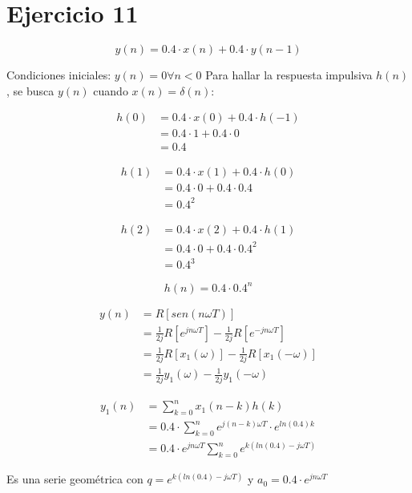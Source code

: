 \documentclass[../../guia1.tex]{subfiles}
\begin{document}
\section*{Ejercicio 11}
\[y(n) = 0.4\cdot x(n) + 0.4\cdot y(n-1)\]

Condiciones iniciales: $y(n)=0 \forall n<0$
Para hallar la respuesta impulsiva $h(n)$, se busca $y(n)$ cuando $x(n) = \delta(n)$:

\begin{align*}
	h(0) &= 0.4\cdot x(0) + 0.4 \cdot h(-1)\\
		 &= 0.4\cdot 1 + 0.4 \cdot 0\\
		 &= 0.4
\end{align*}


\begin{align*}
	h(1) &= 0.4\cdot x(1) + 0.4 \cdot h(0)\\
		 &= 0.4\cdot 0 + 0.4 \cdot 0.4\\
		 &=0.4^2
\end{align*}


\begin{align*}
	h(2) &= 0.4\cdot x(2) + 0.4 \cdot h(1)\\
		 &= 0.4\cdot 0 + 0.4 \cdot 0.4^2\\
		 &= 0.4^3
\end{align*}


\[h(n) = 0.4\cdot 0.4^n\]

\begin{align*}
y(n) &= R \left[sen(n\omega T)\right]\\
	 &= \frac{1}{2j} R\left[ e^{jn\omega T}\right]
	  - \frac{1}{2j} R\left[e^{-jn\omega T}\right]\\
	 &= \frac{1}{2j} R\left[ x_1(\omega)\right]
	  - \frac{1}{2j} R\left[ x_1(-\omega)\right]\\
	 &= \frac{1}{2j} y_1(\omega)
	  - \frac{1}{2j} y_1(-\omega)
\end{align*}

\vspace{.5in}

\begin{align*}
y_1(n) &=\sum_{k=0}^{n} x_1(n-k)h(k)\\
	   &=0.4\cdot \sum_{k=0}^{n}e^{j(n-k)\omega T}\cdot e^{ln(0.4)k}\\
	   &=0.4\cdot e^{jn\omega T}\sum_{k=0}^{n}e^{k(ln(0.4)-j\omega T)}
\end{align*}

Es una serie geom\'etrica con $q = e^{k(ln(0.4)-j\omega T)}$ y $a_0 = 0.4\cdot e^{jn\omega T}$
\end{document}

